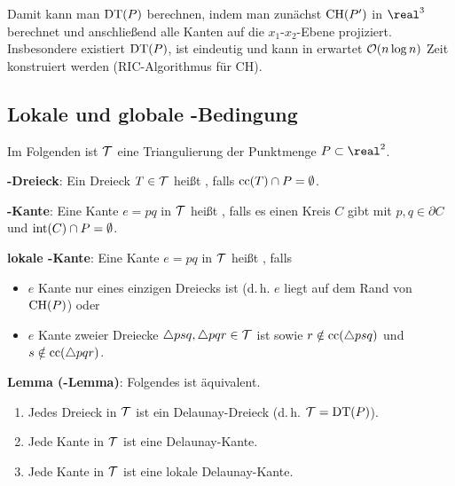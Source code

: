 Damit kann man $\operatorname{DT}(P)$ berechnen, indem man zunächst $\operatorname{CH}(P')$ in $\real^3$ berechnet
und anschließend alle Kanten auf die $x_1$-$x_2$-Ebene projiziert.
Insbesondere existiert $\operatorname{DT}(P)$, ist eindeutig
und kann in erwartet $\mathcal{O}(n \log n)$ Zeit konstruiert werden (RIC-Algorithmus für CH).

\subsection{%
    Lokale und globale -Bedingung%
}

Im Folgenden ist $\mathcal{T}$ eine Triangulierung der Punktmenge $P \subset \real^2$.

\textbf{-Dreieck}:
Ein Dreieck $T \in \mathcal{T}$ heißt , falls $\operatorname{cc}(T) \cap P = \emptyset$.

\textbf{-Kante}:
Eine Kante $e = pq$ in $\mathcal{T}$ heißt , falls es einen Kreis $C$ gibt
mit $p, q \in \partial C$ und $\operatorname{int}(C) \cap P = \emptyset$.

\textbf{lokale -Kante}:
Eine Kante $e = pq$ in $\mathcal{T}$ heißt , falls
\begin{itemize}
    \item
    $e$ Kante nur eines einzigen Dreiecks ist
    (d.\,h. $e$ liegt auf dem Rand von $\operatorname{CH}(P)$) oder
    
    \item
    $e$ Kante zweier Dreiecke $\triangle psq, \triangle pqr \in \mathcal{T}$ ist sowie
    $r \notin \operatorname{cc}(\triangle psq)$ und $s \notin \operatorname{cc}(\triangle pqr)$.
\end{itemize}

\linie

\textbf{Lemma (-Lemma)}:
Folgendes ist äquivalent.
\begin{enumerate}
    \item
    Jedes Dreieck in $\mathcal{T}$ ist ein Delaunay-Dreieck (d.\,h. $\mathcal{T} = \operatorname{DT}(P)$).
    
    \item
    Jede Kante in $\mathcal{T}$ ist eine Delaunay-Kante.
    
    \item
    Jede Kante in $\mathcal{T}$ ist eine lokale Delaunay-Kante.
\end{enumerate}

